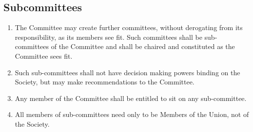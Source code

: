 \documentclass[a4paper]{tufte-handout}
\begin{document}
\subsection{Subcommittees}
\begin{enumerate}[resume]
    \item The Committee may create further committees, without derogating from its responsibility, as its members see fit. Such committees shall be sub-committees of the Committee and shall be chaired and constituted as the Committee sees fit.
    \item Such sub-committees shall not have decision making powers binding on the Society, but may make recommendations to the Committee.
    \item Any member of the Committee shall be entitled to sit on any sub-committee.
    \item All members of sub-committees need only to be Members of the Union, not of the Society.
\end{enumerate}
\end{document}
